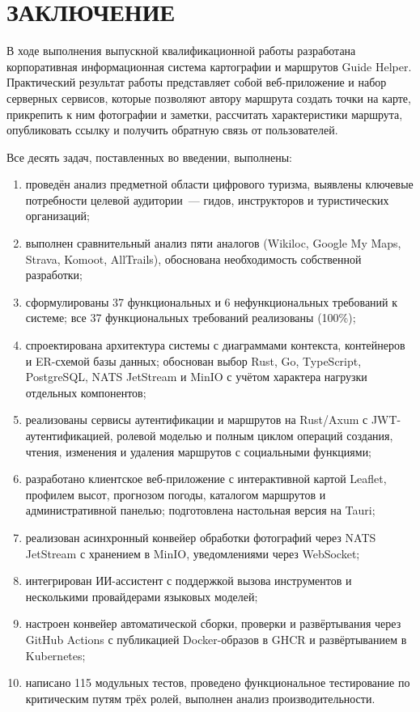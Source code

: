 \chapter*{ЗАКЛЮЧЕНИЕ}

В ходе выполнения выпускной квалификационной работы разработана корпоративная
информационная система картографии и маршрутов Guide Helper. Практический
результат работы
представляет собой веб-приложение и набор серверных сервисов, которые позволяют
автору маршрута создать точки на карте, прикрепить к ним фотографии и заметки,
рассчитать характеристики маршрута, опубликовать ссылку и получить обратную
связь от пользователей.

Все десять задач, поставленных во введении, выполнены:
\begin{enumerate}
  \item проведён анализ предметной области цифрового туризма, выявлены ключевые потребности целевой аудитории~--- гидов, инструкторов и туристических организаций;
  \item выполнен сравнительный анализ пяти аналогов (Wikiloc, Google My Maps, Strava, Komoot, AllTrails), обоснована необходимость собственной разработки;
  \item сформулированы 37 функциональных и 6 нефункциональных требований к системе; все 37 функциональных требований реализованы (100\%);
  \item спроектирована архитектура системы с диаграммами контекста, контейнеров и ER-схемой базы данных; обоснован выбор Rust, Go, TypeScript, PostgreSQL, NATS JetStream и MinIO с учётом характера нагрузки отдельных компонентов;
  \item реализованы сервисы аутентификации и маршрутов на Rust/Axum с JWT-аутентификацией, ролевой моделью и полным циклом операций создания, чтения, изменения и удаления маршрутов с социальными функциями;
  \item разработано клиентское веб-приложение с интерактивной картой Leaflet, профилем высот, прогнозом погоды, каталогом маршрутов и административной панелью; подготовлена настольная версия на Tauri;
  \item реализован асинхронный конвейер обработки фотографий через NATS JetStream с хранением в MinIO, уведомлениями через WebSocket;
  \item интегрирован ИИ-ассистент с поддержкой вызова инструментов и несколькими провайдерами языковых моделей;
  \item настроен конвейер автоматической сборки, проверки и развёртывания через GitHub Actions с публикацией Docker-образов в GHCR и развёртыванием в Kubernetes;
  \item написано 115 модульных тестов, проведено функциональное тестирование по критическим путям трёх ролей, выполнен анализ производительности.
\end{enumerate}

